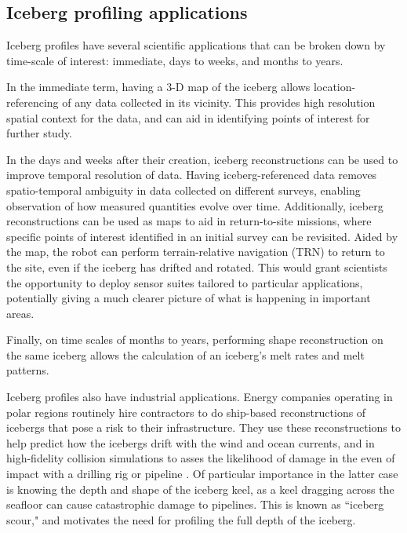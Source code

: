 \subsection{Iceberg profiling applications}

Iceberg profiles have several scientific applications that can be broken down by time-scale of interest: immediate, days to weeks, and months to years. 

In the immediate term, having a 3-D map of the iceberg allows location-referencing of any data collected in its vicinity. This provides high resolution spatial context for the data, and can aid in identifying points of interest for further study. 

In the days and weeks after their creation, iceberg reconstructions can be used to improve temporal resolution of data. Having iceberg-referenced data removes spatio-temporal ambiguity in data collected on different surveys, enabling observation of how measured quantities evolve over time. Additionally, iceberg reconstructions can be used as maps to aid in return-to-site missions, where specific points of interest identified in an initial survey can be revisited. Aided by the map, the robot can perform terrain-relative navigation (TRN) to return to the site, even if the iceberg has drifted and rotated\cite{Kimball2011b}. This would grant scientists the opportunity to deploy sensor suites tailored to particular applications, potentially giving a much clearer picture of what is happening in important areas.

Finally, on time scales of months to years, performing shape reconstruction on the same iceberg allows the calculation of an iceberg's melt rates and melt patterns.

Iceberg profiles also have industrial applications. Energy companies operating in polar regions routinely hire contractors to do ship-based reconstructions of icebergs that pose a risk to their infrastructure. They use these reconstructions to help predict how the icebergs drift with the wind and ocean currents, and in high-fidelity collision simulations to asses the likelihood of damage in the even of impact with a drilling rig or pipeline \cite{ralph2008iceberg} \cite{fuglem1996iceberg}. Of particular importance in the latter case is knowing the depth and shape of the iceberg keel, as a keel dragging across the seafloor can cause catastrophic damage to pipelines. This is known as ``iceberg scour," and motivates the need for profiling the full depth of the iceberg.

